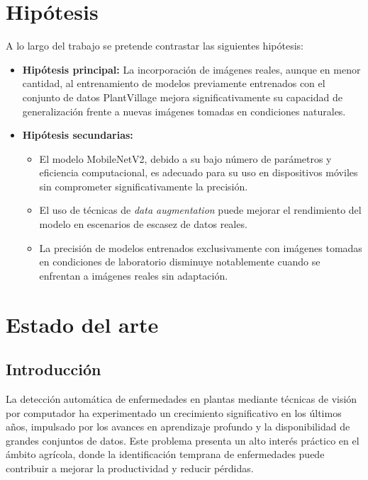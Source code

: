 \documentclass[12pt,a4paper]{article}
\begin{document}
\section{Hipótesis}

A lo largo del trabajo se pretende contrastar las siguientes hipótesis:

\begin{itemize}
    \item \textbf{Hipótesis principal:} La incorporación de imágenes reales, aunque en menor cantidad, al entrenamiento de modelos previamente entrenados con el conjunto de datos PlantVillage mejora significativamente su capacidad de generalización frente a nuevas imágenes tomadas en condiciones naturales.

    \item \textbf{Hipótesis secundarias:}
    \begin{itemize}
        \item El modelo MobileNetV2, debido a su bajo número de parámetros y eficiencia computacional, es adecuado para su uso en dispositivos móviles sin comprometer significativamente la precisión.
        \item El uso de técnicas de \textit{data augmentation} puede mejorar el rendimiento del modelo en escenarios de escasez de datos reales.
        \item La precisión de modelos entrenados exclusivamente con imágenes tomadas en condiciones de laboratorio disminuye notablemente cuando se enfrentan a imágenes reales sin adaptación.
    \end{itemize}
\end{itemize}

\section{Estado del arte}

\subsection{Introducción}

La detección automática de enfermedades en plantas mediante técnicas de visión por computador ha experimentado un crecimiento significativo en los últimos años, impulsado por los avances en aprendizaje profundo y la disponibilidad de grandes conjuntos de datos. Este problema presenta un alto interés práctico en el ámbito agrícola, donde la identificación temprana de enfermedades puede contribuir a mejorar la productividad y reducir pérdidas.
\end{document}
